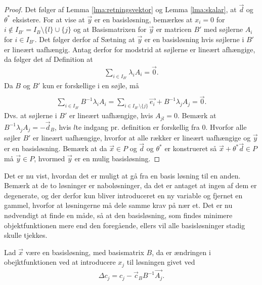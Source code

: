 \begin{proof}
Det følger af Lemma \ref{lma:retningsvektor} og Lemma \ref{lma:skalar}, at $\vec{d}$ og $\theta^*$ eksistere. 
For at vise at $\vec{y}$ er en basisløsning, bemærkes at $x_i = 0$ for $i \notin I_{B'} = I_B\setminus\{l\}\cup\{j\}$ og at Basismatrixen for $\vec{y}$ er matricen $B'$ med søjlerne $A_i$ for $i \in I_{B'}$. 
Det følger derfor af Sætning
at $\vec{y}$ er en basisløsning hvis søjlerne i $B'$ er lineært uafhængig.
Antag derfor for modstrid at søjlerne er lineært afhængige, da følger det af Definition
at
\begin{align*}
 \sum_{i \in I_{B'}} \lambda_i A_i = \vec{0}.
\end{align*}
Da $B$ og $B'$ kun er forskellige i en søjle, må
\begin{align*}
 \\ \sum_{i \in I_{B'}}  B^{-1} \lambda_i A_i  =\sum_{i \in I_{B'}\setminus \{j\}} \vec{e_i} + B^{-1} \lambda_j A_j = \vec{0}.
\end{align*}
Dvs. at søjlerne i $B'$ er lineært uafhængige, hvis $A_{jl} = 0$.
Bemærk at $B^{-1} \lambda_j A_j = - \vec{d}_B$, hvis $l$te indgang pr. definition er forskellig fra $0$. 
Hvorfor alle søjler $B'$ er lineært uafhængige, hvorfor at alle rækker er lineært uafhængige og $\vec{y}$ er en basisløsning.
Bemærk at da $\vec{x}\in P$ og $\vec{d}$ og $\theta^*$ er konstrueret så $\vec{x}+\theta^*\vec{d} \in P$ må $\vec{y} \in P$, hvormed $\vec{y}$ er en mulig basisløsning.
\end{proof}
Det er nu vist, hvordan det er muligt at gå fra en basis løsning til en anden.
 Bemærk at de to løsninger er naboløsninger, da det er antaget at ingen af dem er degenerate, og der derfor kun bliver introduceret en ny variable og fjernet en gammel, hvorfor at løsningerne må dele samme krav på nær et. 
Det er nu nødvendigt at finde en måde, så at den basisløsning, som findes minimere objektfunktionen mere end den foregående, ellers vil alle basisløsninger stadig skulle tjekkes. 
\begin{stn}
Lad $\vec{x}$ være en basisløsning, med basismatrix $B$, da er ændringen i obejktfunktionen ved at introducere $x_j$ til løsningen givet ved
\begin{align*}
 \Delta c_j = c_j-\vec{c}_B B^{-1}\vec{A_j}.
\end{align*}
\end{stn}

